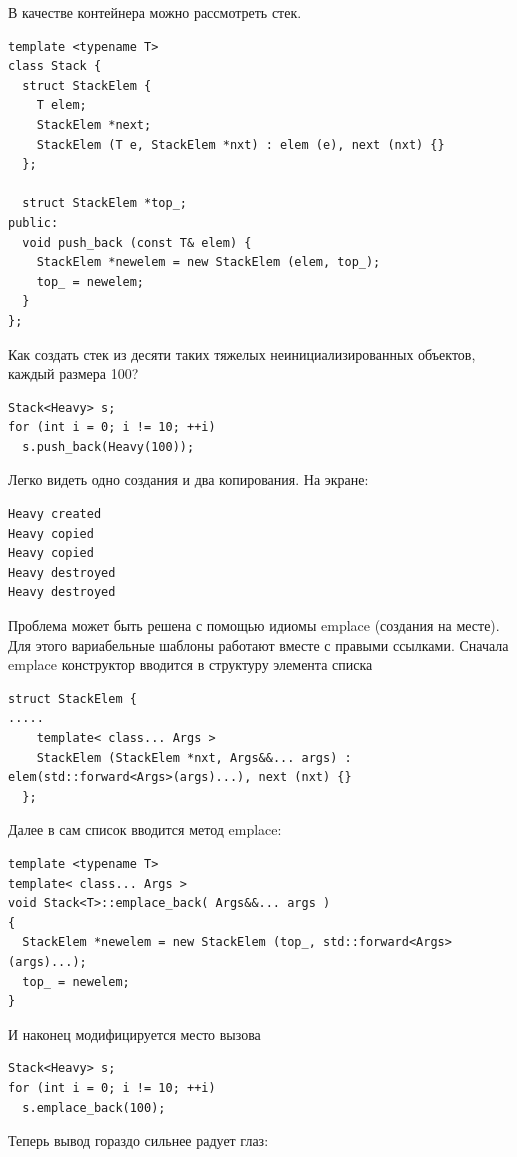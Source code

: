 \documentclass[a4paper,12pt,oneside]{article}
\begin{document}
В качестве контейнера можно рассмотреть стек.

\begin{lstlisting}
template <typename T>
class Stack {
  struct StackElem {
    T elem;
    StackElem *next;
    StackElem (T e, StackElem *nxt) : elem (e), next (nxt) {}
  };

  struct StackElem *top_;
public:
  void push_back (const T& elem) {
    StackElem *newelem = new StackElem (elem, top_);
    top_ = newelem;
  }
};
\end{lstlisting}

Как создать стек из десяти таких тяжелых неинициализированных объектов, каждый размера 100?

\begin{lstlisting}
Stack<Heavy> s;
for (int i = 0; i != 10; ++i)
  s.push_back(Heavy(100));
\end{lstlisting}

Легко видеть одно создания и два копирования. На экране:

\begin{verbatim}
Heavy created
Heavy copied
Heavy copied
Heavy destroyed
Heavy destroyed
\end{verbatim}

Проблема может быть решена с помощью идиомы emplace (создания на месте). Для этого вариабельные шаблоны работают вместе с правыми ссылками. Сначала emplace конструктор вводится в структуру элемента списка

\begin{lstlisting}
struct StackElem {
.....
    template< class... Args >
    StackElem (StackElem *nxt, Args&&... args) : elem(std::forward<Args>(args)...), next (nxt) {}
  };
\end{lstlisting}

Далее в сам список вводится метод emplace:

\begin{lstlisting}
template <typename T>
template< class... Args >
void Stack<T>::emplace_back( Args&&... args )
{
  StackElem *newelem = new StackElem (top_, std::forward<Args>(args)...);
  top_ = newelem;
}
\end{lstlisting}

И наконец модифицируется место вызова

\begin{lstlisting}
Stack<Heavy> s;
for (int i = 0; i != 10; ++i)
  s.emplace_back(100);
\end{lstlisting}

Теперь вывод гораздо сильнее радует глаз:
\end{document}
